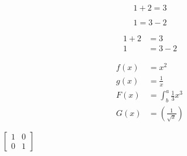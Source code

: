\documentclass{article}
\begin{document}
\begin{equation*}
	1 + 2 = 3
\end{equation*}

\begin{equation*}
	1 = 3 - 2
\end{equation*}

\begin{align*}
	1 + 2 &= 3\\
	1 &= 3 - 2
\end{align*}

\begin{align*}
	f(x) &= x^2\\
	g(x) &= \frac{1}{x}\\
	F(x) &= \int^a_b \frac{1}{3}x^3\\
	G(x) &= \left(\frac{1}{\sqrt{x}}\right)
\end{align*}

\begin{center}
$\left[
\begin{matrix}
	1&0\\
	0&1
\end{matrix}
\right]$
\end{center}
\end{document}
